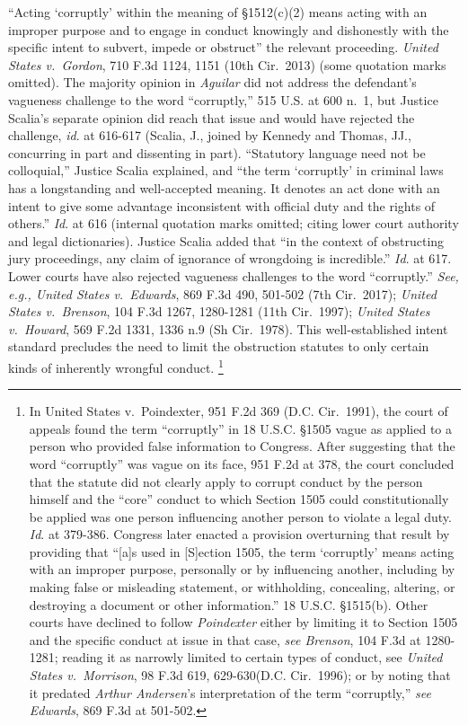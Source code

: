 “Acting ‘corruptly’ within the meaning of \S 1512(c)(2) means acting with an improper purpose and to engage in conduct knowingly and dishonestly with the specific intent to subvert, impede or obstruct” the relevant proceeding.
\textit{United States v.\ Gordon}, 710 F.3d 1124, 1151 (10th Cir.~2013) (some quotation marks omitted).
The majority opinion in \textit{Aguilar} did not address the defendant’s vagueness challenge to the word “corruptly,” 515 U.S. at 600 n.~1, but Justice Scalia’s separate opinion did reach that issue and would have rejected the challenge, \textit{id}. at 616-617 (Scalia, J., joined by Kennedy and Thomas, JJ., concurring in part and dissenting in part).
“Statutory language need not be colloquial,” Justice Scalia explained, and “the term ‘corruptly’ in criminal laws has a longstanding and well-accepted meaning.
It denotes an act done with an intent to give some advantage inconsistent with official duty and the rights of others.”
\textit{Id}. at 616 (internal quotation marks omitted; citing lower court authority and legal dictionaries).
Justice Scalia added that “in the context of obstructing jury proceedings, any claim of ignorance of wrongdoing is incredible.”
\textit{Id}. at 617.
Lower courts have also rejected vagueness challenges to the word “corruptly.”
\textit{See, e.g., United States v.\ Edwards}, 869 F.3d 490, 501-502 (7th Cir.~2017);
\textit{United States v.\ Brenson}, 104 F.3d 1267, 1280-1281 (11th Cir.~1997);
\textit{United States v.\ Howard}, 569 F.2d 1331, 1336 n.9 (Sh Cir.~1978).
This well-established intent standard precludes the need to limit the obstruction statutes to only certain kinds of inherently wrongful conduct.%
\footnote{In United States v.\ Poindexter, 951 F.2d 369 (D.C. Cir.~1991), the court of appeals found the term “corruptly” in 18 U.S.C. \S 1505 vague as applied to a person who provided false information to Congress.
After suggesting that the word “corruptly” was vague on its face, 951 F.2d at 378, the court concluded that the statute did not clearly apply to corrupt conduct by the person himself and the “core” conduct to which Section 1505 could constitutionally be applied was one person influencing another person to violate a legal duty.
\textit{Id}. at 379-386.
Congress later enacted a provision overturning that result by providing that “[a]s used in [S]ection 1505, the term ‘corruptly’ means acting with an improper purpose, personally or by influencing another, including by making false or misleading statement, or withholding, concealing, altering, or destroying a document or other information.”
18 U.S.C. \S 1515(b).
Other courts have declined to follow \textit{Poindexter} either by limiting it to Section 1505 and the specific conduct at issue in that case, \textit{see Brenson}, 104 F.3d at 1280-1281;
reading it as narrowly limited to certain types of conduct, see \textit{United States v.\ Morrison}, 98 F.3d 619, 629-630(D.C. Cir.~1996);
or by noting that it predated \textit{Arthur Andersen}’s interpretation of the term “corruptly,” \textit{see Edwards}, 869 F.3d at 501-502.
 }

